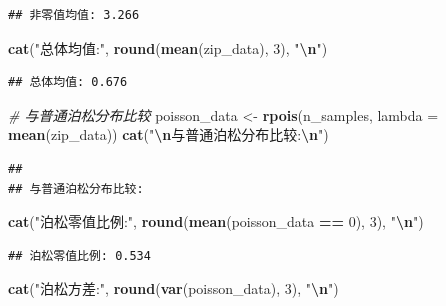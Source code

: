 \documentclass[
]{book}
\newenvironment{Shaded}{\begin{snugshade}}{\end{snugshade}}
\newcommand{\AttributeTok}[1]{\textcolor[rgb]{0.13,0.29,0.53}{#1}}
\newcommand{\CommentTok}[1]{\textcolor[rgb]{0.56,0.35,0.01}{\textit{#1}}}
\newcommand{\DecValTok}[1]{\textcolor[rgb]{0.00,0.00,0.81}{#1}}
\newcommand{\FunctionTok}[1]{\textcolor[rgb]{0.13,0.29,0.53}{\textbf{#1}}}
\newcommand{\NormalTok}[1]{#1}
\newcommand{\OtherTok}[1]{\textcolor[rgb]{0.56,0.35,0.01}{#1}}
\newcommand{\SpecialCharTok}[1]{\textcolor[rgb]{0.81,0.36,0.00}{\textbf{#1}}}
\newcommand{\StringTok}[1]{\textcolor[rgb]{0.31,0.60,0.02}{#1}}
\begin{document}
\begin{verbatim}
## 非零值均值: 3.266
\end{verbatim}

\begin{Shaded}
\begin{Highlighting}[]
\FunctionTok{cat}\NormalTok{(}\StringTok{"总体均值:"}\NormalTok{, }\FunctionTok{round}\NormalTok{(}\FunctionTok{mean}\NormalTok{(zip\_data), }\DecValTok{3}\NormalTok{), }\StringTok{"}\SpecialCharTok{\textbackslash{}n}\StringTok{"}\NormalTok{)}
\end{Highlighting}
\end{Shaded}

\begin{verbatim}
## 总体均值: 0.676
\end{verbatim}

\begin{Shaded}
\begin{Highlighting}[]
\CommentTok{\# 与普通泊松分布比较}
\NormalTok{poisson\_data }\OtherTok{\textless{}{-}} \FunctionTok{rpois}\NormalTok{(n\_samples, }\AttributeTok{lambda =} \FunctionTok{mean}\NormalTok{(zip\_data))}
\FunctionTok{cat}\NormalTok{(}\StringTok{"}\SpecialCharTok{\textbackslash{}n}\StringTok{与普通泊松分布比较:}\SpecialCharTok{\textbackslash{}n}\StringTok{"}\NormalTok{)}
\end{Highlighting}
\end{Shaded}

\begin{verbatim}
## 
## 与普通泊松分布比较:
\end{verbatim}

\begin{Shaded}
\begin{Highlighting}[]
\FunctionTok{cat}\NormalTok{(}\StringTok{"泊松零值比例:"}\NormalTok{, }\FunctionTok{round}\NormalTok{(}\FunctionTok{mean}\NormalTok{(poisson\_data }\SpecialCharTok{==} \DecValTok{0}\NormalTok{), }\DecValTok{3}\NormalTok{), }\StringTok{"}\SpecialCharTok{\textbackslash{}n}\StringTok{"}\NormalTok{)}
\end{Highlighting}
\end{Shaded}

\begin{verbatim}
## 泊松零值比例: 0.534
\end{verbatim}

\begin{Shaded}
\begin{Highlighting}[]
\FunctionTok{cat}\NormalTok{(}\StringTok{"泊松方差:"}\NormalTok{, }\FunctionTok{round}\NormalTok{(}\FunctionTok{var}\NormalTok{(poisson\_data), }\DecValTok{3}\NormalTok{), }\StringTok{"}\SpecialCharTok{\textbackslash{}n}\StringTok{"}\NormalTok{)}
\end{Highlighting}
\end{Shaded}
\end{document}
